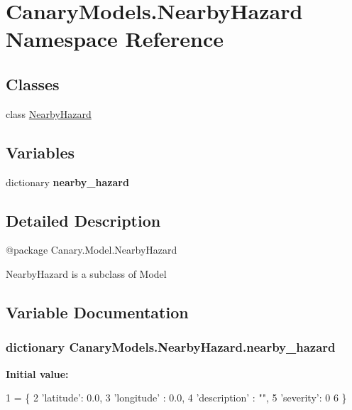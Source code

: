 \hypertarget{namespace_canary_models_1_1_nearby_hazard}{\section{Canary\-Models.\-Nearby\-Hazard Namespace Reference}
\label{namespace_canary_models_1_1_nearby_hazard}
}
\subsection*{Classes}
\begin{DoxyCompactItemize}
\item 
class \hyperlink{class_canary_models_1_1_nearby_hazard_1_1_nearby_hazard}{Nearby\-Hazard}
\end{DoxyCompactItemize}
\subsection*{Variables}
\begin{DoxyCompactItemize}
\item 
dictionary {\bfseries nearby\-\_\-hazard}
\end{DoxyCompactItemize}


\subsection{Detailed Description}
\begin{DoxyVerb}@package Canary.Model.NearbyHazard

NearbyHazard is a subclass of Model
\end{DoxyVerb}
 

\subsection{Variable Documentation}
\hypertarget{namespace_canary_models_1_1_nearby_hazard_a433356536279baf91b347075cd3e66ef}{
\subsubsection[{nearby\-\_\-hazard}]{\setlength{\rightskip}{0pt plus 5cm}dictionary Canary\-Models.\-Nearby\-Hazard.\-nearby\-\_\-hazard}}\label{namespace_canary_models_1_1_nearby_hazard_a433356536279baf91b347075cd3e66ef}
{\bfseries Initial value\-:}
\begin{DoxyCode}
1 = \{
2     \textcolor{stringliteral}{'latitude'}: 0.0,
3     \textcolor{stringliteral}{'longitude'} : 0.0,
4     \textcolor{stringliteral}{'description'} : \textcolor{stringliteral}{""},
5     \textcolor{stringliteral}{'severity'}: 0
6 \}
\end{DoxyCode}
